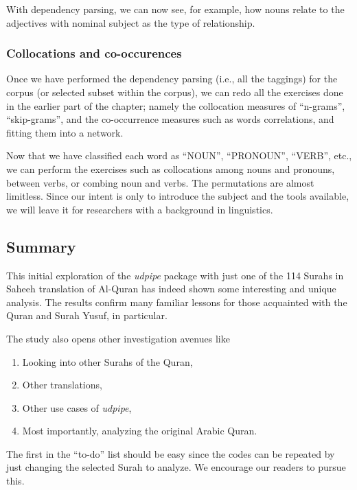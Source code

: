 \documentclass[
]{article}
\providecommand{\tightlist}{%
  \setlength{\itemsep}{0pt}\setlength{\parskip}{0pt}}
\begin{document}
With dependency parsing, we can now see, for example, how nouns relate to the adjectives with nominal subject as the type of relationship.

\hypertarget{collocations-and-co-occurences}{%
\subsubsection{Collocations and co-occurences}\label{collocations-and-co-occurences}}

Once we have performed the dependency parsing (i.e., all the taggings) for the corpus (or selected subset within the corpus), we can redo all the exercises done in the earlier part of the chapter; namely the collocation measures of ``n-grams'', ``skip-grams'', and the co-occurrence measures such as words correlations, and fitting them into a network.

Now that we have classified each word as ``NOUN'', ``PRONOUN'', ``VERB'', etc., we can perform the exercises such as collocations among nouns and pronouns, between verbs, or combing noun and verbs. The permutations are almost limitless. Since our intent is only to introduce the subject and the tools available, we will leave it for researchers with a background in linguistics.

\hypertarget{chapter-4-summary}{%
\subsection{Summary}\label{chapter-4-summary}}

This initial exploration of the \emph{udpipe} package with just one of the 114 Surahs in Saheeh translation of Al-Quran has indeed shown some interesting and unique analysis. The results confirm many familiar lessons for those acquainted with the Quran and Surah Yusuf, in particular.

The study also opens other investigation avenues like

\begin{enumerate}
\def\labelenumi{\arabic{enumi}.}
\tightlist
\item
  Looking into other Surahs of the Quran,
\item
  Other translations,
\item
  Other use cases of \emph{udpipe},
\item
  Most importantly, analyzing the original Arabic Quran.
\end{enumerate}

The first in the ``to-do'' list should be easy since the codes can be repeated by just changing the selected Surah to analyze. We encourage our readers to pursue this.
\end{document}

